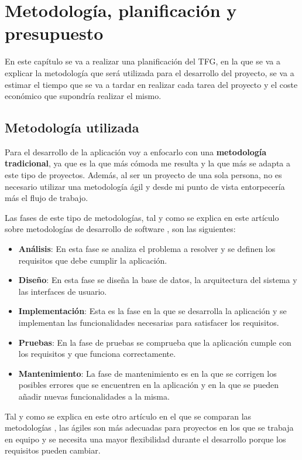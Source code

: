 \chapter{Metodología, planificación y presupuesto}
En este capítulo se va a realizar una planificación del TFG, en la que se
va a explicar la metodología que será utilizada para el desarrollo del proyecto,
se va a estimar el tiempo que se va a tardar en realizar cada tarea del proyecto
y el coste económico que supondría realizar el mismo.

\section{Metodología utilizada}
Para el desarrollo de la aplicación voy a enfocarlo con una \textbf{metodología
tradicional}, ya que es la que más cómoda me resulta y la que más se adapta
a este tipo de proyectos. Además, al ser un proyecto de una sola persona, no es
necesario utilizar una metodología ágil y desde mi punto de vista entorpecería
más el flujo de trabajo.

Las fases de este tipo de metodologías, tal y como se explica en este artículo
sobre metodologías de desarrollo de software \cite{metodologias}, son las siguientes:

\begin{itemize}
  \item \textbf{Análisis}: En esta fase se analiza el problema a resolver y se
  definen los requisitos que debe cumplir la aplicación.
  \item \textbf{Diseño}: En esta fase se diseña la base de datos, la arquitectura
  del sistema y las interfaces de usuario.
  \item \textbf{Implementación}: Esta es la fase en la que se desarrolla la
  aplicación y se implementan las funcionalidades necesarias para satisfacer
  los requisitos.
  \item \textbf{Pruebas}: En la fase de pruebas se comprueba que la aplicación
  cumple con los requisitos y que funciona correctamente.
  \item \textbf{Mantenimiento}: La fase de mantenimiento es en la que se corrigen
  los posibles errores que se encuentren en la aplicación y en la que se pueden
  añadir nuevas funcionalidades a la misma.
\end{itemize}

Tal y como se explica en este otro artículo en el que se comparan las metodologías
\cite{tradicionalesVSagiles}, las ágiles son más adecuadas para proyectos
en los que se trabaja en equipo y se necesita una mayor flexibilidad durante el
desarrollo porque los requisitos pueden cambiar.

